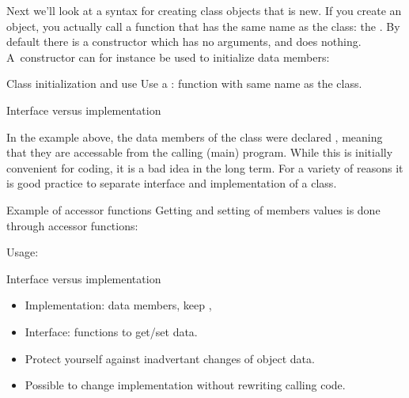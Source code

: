 Next we'll look at a syntax for creating class objects that is new. If
you create an object, you actually call a function that has the same
name as the class: the . By default there is a
constructor which has no arguments, and does nothing. A~constructor
can for instance be used to initialize data members:
%

\begin{slide}{Class initialization and use}
  \label{sl:class-construct}
  Use a : function with same name as the class.
\end{slide}

 {Interface versus implementation}

In the example above, the data members of the  class were
declared , meaning that they are accessable from the calling
(main) program. While this is initially convenient for coding, it is a bad idea
in the long term. For a variety of reasons it is good practice to
separate interface and implementation of a class.

\begin{block}{Example of accessor functions}
  \label{sl:pointaccess}
  Getting and setting of members values is done through accessor functions:
  \begin{multicols}{2}
    Usage:
  \end{multicols}
\end{block}

\begin{block}{Interface versus implementation}
  \label{sl:interfaceimpl}
  \begin{itemize}
  \item Implementation: data members, keep ,
  \item Interface:  functions to get/set data.
  \item Protect yourself against inadvertant changes of object data.
  \item Possible to change implementation without rewriting calling code.
  \end{itemize}
\end{block}

